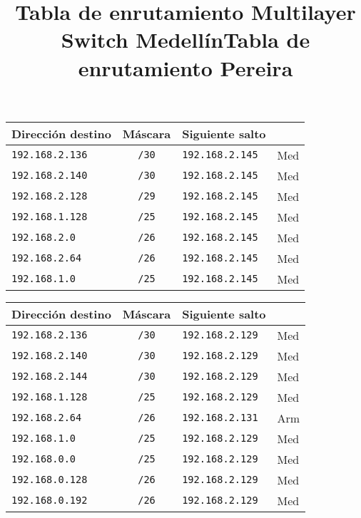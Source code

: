 \begin{table}[h]
\label{enrutamientoSwMed}
\begin{center}
\title{Tabla de enrutamiento Multilayer Switch Medellín}
\begin{tabular}{lcll}
Dirección destino & Máscara & Siguiente salto &  \\ \hline
\verb=192.168.2.136= & \verb=/30= & \verb=192.168.2.145 = & Med \\
\verb=192.168.2.140= & \verb=/30= & \verb=192.168.2.145 = & Med \\
\verb=192.168.2.128= & \verb=/29= & \verb=192.168.2.145 = & Med \\
\verb=192.168.1.128= & \verb=/25= & \verb=192.168.2.145 = & Med \\
\verb=192.168.2.0= & \verb=/26= & \verb=192.168.2.145 = & Med \\
\verb=192.168.2.64= & \verb=/26= & \verb=192.168.2.145 = & Med \\
\verb=192.168.1.0= & \verb=/25= & \verb=192.168.2.145 = & Med \\
\end{tabular}
\end{center}
\end{table}%

\begin{table}[h]
\label{enrutamientoPer}
\begin{center}
\title{Tabla de enrutamiento Pereira}
\begin{tabular}{lcll}
Dirección destino & Máscara & Siguiente salto &  \\ \hline
\verb=192.168.2.136= & \verb=/30= & \verb=192.168.2.129 = & Med \\
\verb=192.168.2.140= & \verb=/30= & \verb=192.168.2.129 = & Med \\
\verb=192.168.2.144= & \verb=/30= & \verb=192.168.2.129 = & Med \\
\verb=192.168.1.128= & \verb=/25= & \verb=192.168.2.129 = & Med \\
\verb=192.168.2.64= & \verb=/26= & \verb=192.168.2.131 = & Arm \\
\verb=192.168.1.0= & \verb=/25= & \verb=192.168.2.129 = & Med \\
\verb=192.168.0.0= & \verb=/25= & \verb=192.168.2.129 = & Med \\
\verb=192.168.0.128= & \verb=/26= & \verb=192.168.2.129 = & Med \\
\verb=192.168.0.192= & \verb=/26= & \verb=192.168.2.129 = & Med \\
\end{tabular}
\end{center}
\end{table}%

%
